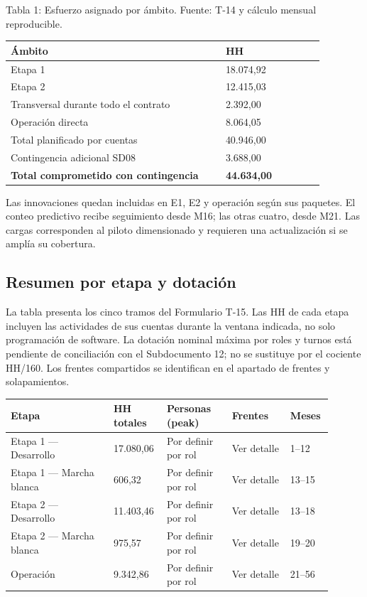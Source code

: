 Tabla 1: Esfuerzo asignado por ámbito. Fuente: T-14 y cálculo mensual reproducible.

\begin{longtable}{@{}p{0.633\linewidth}p{0.297\linewidth}@{}}
\toprule
\textbf{Ámbito} & \textbf{HH} \\
\midrule
\endhead
\bottomrule
\endlastfoot
Etapa 1 & 18.074,92 \\
Etapa 2 & 12.415,03 \\
Transversal durante todo el contrato & 2.392,00 \\
Operación directa & 8.064,05 \\
Total planificado por cuentas & 40.946,00 \\
Contingencia adicional SD08 & 3.688,00 \\
\textbf{Total comprometido con contingencia} & \textbf{44.634,00} \\
\end{longtable}

Las innovaciones quedan incluidas en E1, E2 y operación según sus paquetes. El conteo predictivo recibe seguimiento desde M16; las otras cuatro, desde M21. Las cargas corresponden al piloto dimensionado y requieren una actualización si se amplía su cobertura.

\subsection{Resumen por etapa y dotación}

La tabla presenta los cinco tramos del Formulario T-15. Las HH de cada etapa incluyen las actividades de sus cuentas durante la ventana indicada, no solo programación de software. La dotación nominal máxima por roles y turnos está pendiente de conciliación con el Subdocumento 12; no se sustituye por el cociente HH/160. Los frentes compartidos se identifican en el apartado de frentes y solapamientos.

\begin{longtable}{p{0.30\linewidth}p{0.14\linewidth}p{0.19\linewidth}p{0.17\linewidth}p{0.10\linewidth}}
\toprule
Etapa & HH totales & Personas (peak) & Frentes & Meses \\
\midrule
\endhead
Etapa 1 — Desarrollo & 17.080,06 & Por definir por rol & Ver detalle & 1–12 \\
Etapa 1 — Marcha blanca & 606,32 & Por definir por rol & Ver detalle & 13–15 \\
Etapa 2 — Desarrollo & 11.403,46 & Por definir por rol & Ver detalle & 13–18 \\
Etapa 2 — Marcha blanca & 975,57 & Por definir por rol & Ver detalle & 19–20 \\
Operación & 9.342,86 & Por definir por rol & Ver detalle & 21–56 \\
\bottomrule
\end{longtable}

